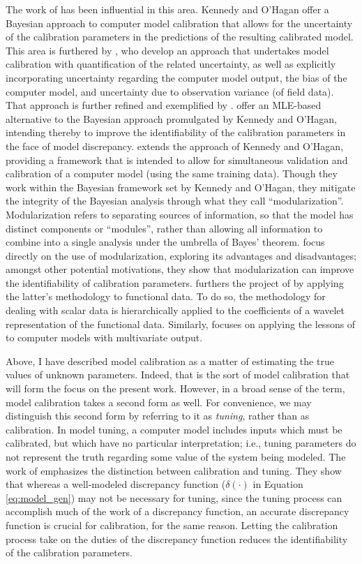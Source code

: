 \documentclass{article}
\begin{document}
The work of \cite{Kennedy2001} has been influential in this area. Kennedy and O'Hagan offer a Bayesian approach to computer model calibration that allows for the uncertainty of the calibration parameters in the predictions of the resulting calibrated model. This area is furthered by \cite{Higdon2004}, who develop an approach that undertakes model calibration with quantification of the related uncertainty, as well as explicitly incorporating uncertainty regarding the computer model output, the bias of the computer model, and uncertainty due to observation variance (of field data). That approach is further refined and exemplified by \cite{Williams2006}.
\cite{Loeppky2006} offer an MLE-based alternative to the Bayesian approach promulgated by Kennedy and O'Hagan, intending thereby to improve the identifiability of the calibration parameters in the face of model discrepancy. 
\cite{Bayarri2007} extends the approach of Kennedy and O'Hagan, providing a framework that is intended to allow for simultaneous validation and calibration of a computer model (using the same training data). Though they  work within the Bayesian framework set by Kennedy and O'Hagan, they mitigate the integrity of the Bayesian analysis through what they call ``modularization''. Modularization refers to separating sources of information, so that the model has distinct components or ``modules'', rather than allowing all information to combine into a single analysis under the umbrella of Bayes' theorem. \cite{Liu2009} focus directly on the use of modularization, exploring its advantages and disadvantages; amongst other potential motivations, they show that modularization can improve the identifiability of calibration parameters. 
\cite{Bayarri} furthers the project of \cite{Bayarri2007} by applying the latter's methodology to functional data. To do so, the methodology for dealing with scalar data is hierarchically applied to the coefficients of a wavelet representation of the functional data. Similarly, \cite{Paulo2012} focuses on applying the lessons of \cite{Bayarri2007} to computer models with multivariate output.

Above, I have described model calibration as a matter of estimating the true values of unknown parameters. Indeed, that is the sort of model calibration that will form the focus on the present work. However, in a broad sense of the term, model calibration takes a second form as well. For convenience, we may distinguish this second form by referring to it as \emph{tuning}, rather than as calibration. In model tuning, a computer model includes inputs which must be calibrated, but which have no particular interpretation; i.e., tuning parameters do not represent the truth regarding some value of the system being modeled. The work of \cite{Brynjarsdottir2014} emphasizes the distinction between calibration and tuning. They show that whereas a well-modeled discrepancy function ($\delta(\cdot)$ in Equation \ref{eq:model_gen}) may not be necessary for tuning, since the tuning process can accomplish much of the work of a discrepancy function, an accurate discrepancy function is crucial for calibration, for the same reason. Letting the calibration process take on the duties of the discrepancy function reduces the identifiability of the calibration parameters.
\end{document}
